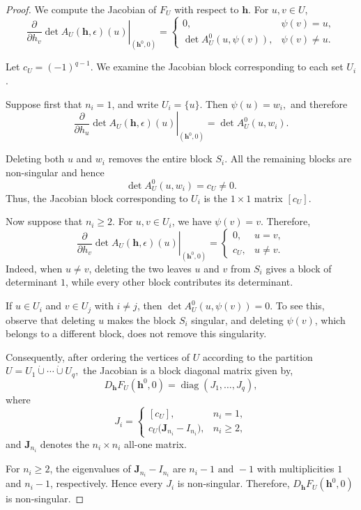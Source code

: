 \documentclass[12pt,reqno]{amsart}
\theoremstyle{plain}
\theoremstyle{definition}
\theoremstyle{block}
\theoremstyle{remark}
\numberwithin{equation}{section}
\begin{document}
\begin{proof}
We compute the Jacobian of \(F_U\) with respect to \(\mathbf h\).
For \(u,v\in U\),
\[
\left.
\frac{\partial}{\partial h_v}
\det A_U(\mathbf h,\epsilon)(u)
\right|_{(\mathbf h^0,0)}
=
\begin{cases}
0,
& \psi(v)=u,\\[1mm]
\det A_U^0(u,\psi(v)),
& \psi(v)\neq u.
\end{cases}
\]

Let
\(
c_U=(-1)^{q-1}.
\)
We examine the Jacobian block corresponding to each set \(U_i\).

Suppose first that \(n_i=1\), and write \(U_i=\{u\}\). Then
\(
\psi(u)=w_i,
\)
and therefore
\[
\left.
\frac{\partial}{\partial h_u}
\det A_U(\mathbf h,\epsilon)(u)
\right|_{(\mathbf h^0,0)}
=
\det A_U^0(u,w_i).
\]

Deleting both \(u\) and \(w_i\) removes the entire block \(S_i\).
All the remaining blocks are non-singular and hence
\[
\det A_U^0(u,w_i)=c_U\neq0.
\]
Thus, the Jacobian block corresponding to \(U_i\) is the
\(1\times1\) matrix
\(
[c_U].
\)

Now suppose that \(n_i\geq2\). For \(u,v\in U_i\), we have
\(\psi(v)=v\). Therefore,
\[
\left.
\frac{\partial}{\partial h_v}
\det A_U(\mathbf h,\epsilon)(u)
\right|_{(\mathbf h^0,0)}
=
\begin{cases}
0, & u=v,\\
c_U, & u\neq v.
\end{cases}
\]
Indeed, when \(u\neq v\), deleting the two leaves \(u\) and \(v\)
from \(S_i\) gives a block of determinant \(1\), while every other
block contributes its determinant.

If \(u\in U_i\) and \(v\in U_j\) with \(i\neq j\), then
\(
\det A_U^0(u,\psi(v))=0.
\)
To see this, observe that deleting \(u\) makes the block \(S_i\)
singular, and deleting \(\psi(v)\), which belongs to a different
block, does not remove this singularity.

Consequently, after ordering the vertices of \(U\) according to the
partition
\(
U=U_1\mathbin{\dot\cup}\cdots\mathbin{\dot\cup}U_q,
\)
the Jacobian is a block diagonal matrix given by,
\[
D_{\mathbf h}F_U(\mathbf h^0,0)
=
\operatorname{diag}(J_1,\ldots,J_q),
\]
where
\[
J_i=
\begin{cases}
[c_U], & n_i=1,\\[2mm]
c_U\bigl(\mathbf J_{n_i}-I_{n_i}\bigr), & n_i\geq2,
\end{cases}
\]
and \(\mathbf J_{n_i}\) denotes the \(n_i\times n_i\) all-one
matrix.

For \(n_i\geq2\), the eigenvalues of
\(\mathbf J_{n_i}-I_{n_i}\) are
\(
n_i-1
\text{ and } 
-1
\)
with multiplicities \(1\) and \(n_i-1\), respectively. Hence every
\(J_i\) is non-singular. Therefore,
\(
D_{\mathbf h}F_U(\mathbf h^0,0)
\)
is non-singular.


\end{proof}
\end{document}
